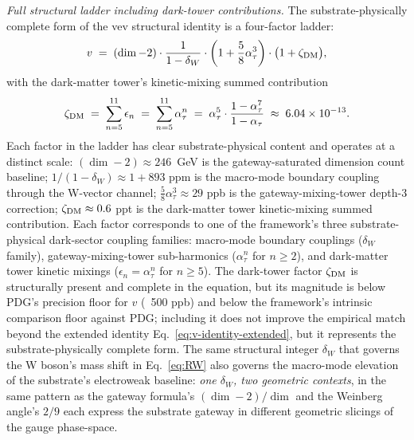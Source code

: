 ﻿\documentclass[reprint,amsmath,amssymb,aps,prd,longbibliography,floatfix]{revtex4-2}
\begin{document}
\emph{Full structural ladder including dark-tower contributions.} The
substrate-physically complete form of the vev structural identity is
a four-factor ladder:
\begin{equation}
v \;=\; (\dim - 2) \cdot \frac{1}{1 - \delta_W} \cdot \biggl(1 + \frac{5}{8}\alpha_\tau^3\biggr) \cdot \bigl(1 + \zeta_{\rm DM}\bigr),
\label{eq:v-full-ladder}
\end{equation}
with the dark-matter tower's kinetic-mixing summed contribution
\begin{equation}
\zeta_{\rm DM} \;=\; \sum_{n=5}^{11} \epsilon_n \;=\; \sum_{n=5}^{11} \alpha_\tau^n \;=\; \alpha_\tau^5 \cdot \frac{1 - \alpha_\tau^7}{1 - \alpha_\tau} \;\approx\; 6.04 \times 10^{-13}.
\label{eq:zeta-dm}
\end{equation}
Each factor in the ladder has clear substrate-physical content and
operates at a distinct scale: $(\dim - 2) \approx 246$~GeV is the
gateway-saturated dimension count baseline; $1/(1 - \delta_W) \approx
1 + 893$ ppm is the macro-mode boundary coupling through the W-vector
channel; $\frac{5}{8}\alpha_\tau^3 \approx 29$ ppb is the
gateway-mixing-tower depth-$3$ correction; $\zeta_{\rm DM} \approx
0.6$ ppt is the dark-matter tower kinetic-mixing summed contribution.
Each factor corresponds to one of the framework's three substrate-physical
dark-sector coupling families: macro-mode boundary couplings
($\delta_W$ family), gateway-mixing-tower sub-harmonics ($\alpha_\tau^n$
for $n \geq 2$), and dark-matter tower kinetic mixings ($\epsilon_n =
\alpha_\tau^n$ for $n \geq 5$). The dark-tower factor $\zeta_{\rm DM}$
is structurally present and complete in the equation, but its
magnitude is below PDG's precision floor for $v$ (~500 ppb) and below
the framework's intrinsic comparison floor against PDG; including it
does not improve the empirical match beyond the extended identity
Eq.~\eqref{eq:v-identity-extended}, but it represents the
substrate-physically complete form. The same structural integer $\delta_W$ that
governs the W boson's mass shift in Eq.~\eqref{eq:RW} also governs
the macro-mode elevation of the substrate's electroweak baseline:
\emph{one $\delta_W$, two geometric contexts}, in the same pattern as
the gateway formula's $(\dim - 2)/\dim$ and the Weinberg angle's
$2/9$ each express the substrate gateway in different geometric
slicings of the gauge phase-space.
\end{document}
